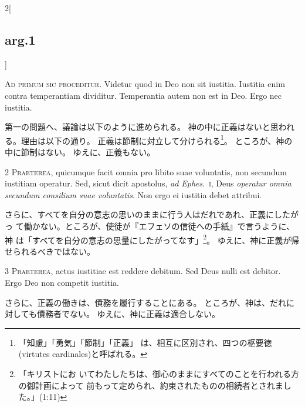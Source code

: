 \documentclass[paper=a4paper,fontsize=10pt,jafontsize=9pt,titlepage]{jlreq}
\begin{document}
\begin{paracol}{2}[\subsection{arg.1}]

{\Huge A}{\scshape d primum sic proceditur}. Videtur quod in
Deo non sit iustitia. Iustitia enim contra temperantiam
dividitur. Temperantia autem non est in Deo. Ergo nec iustitia.

\switchcolumn

第一の問題へ、議論は以下のように進められる。
神の中に正義はないと思われる。理由は以下の通り。
正義は節制に対立して分けられる\footnote{「知慮」「勇気」「節制」「正義」
 は、相互に区別され、四つの枢要徳(virtutes cardinales)と呼ばれる。}。
ところが、神の中に節制はない。
ゆえに、正義もない。


{\scshape 2 Praeterea}, quicumque facit omnia pro libito
suae voluntatis, non secundum iustitiam operatur. Sed, sicut dicit
apostolus, {\itshape ad Ephes}.~{\scshape i}, Deus {\itshape operatur omnia secundum consilium suae
voluntatis}. Non ergo ei iustitia debet attribui.

\switchcolumn

さらに、すべてを自分の意志の思いのままに行う人はだれであれ、正義にしたがっ
 て働かない。ところが、使徒が『エフェソの信徒への手紙』で言うように、神
 は「すべてを自分の意志の思量にしたがってなす」\footnote{「キリストにお
 いてわたしたちは、御心のままにすべてのことを行われる方の御計画によって
 前もって定められ、約束されたものの相続者とされました。」(1:11)}。
ゆえに、神に正義が帰せられるべきではない。


{\scshape 3 Praeterea}, actus iustitiae est reddere
debitum. Sed Deus nulli est debitor. Ergo Deo non competit iustitia.

\switchcolumn

さらに、正義の働きは、債務を履行することにある。
ところが、神は、だれに対しても債務者でない。
ゆえに、神に正義は適合しない。



\end{paracol}
\end{document}
